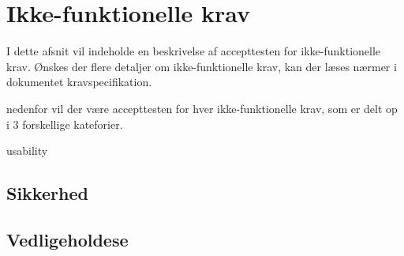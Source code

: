 
\chapter{Ikke-funktionelle krav}

I dette afsnit vil indeholde en beskrivelse af accepttesten for ikke-funktionelle krav. Ønskes der flere detaljer om ikke-funktionelle krav, kan der læses nærmer i dokumentet kravspecifikation.

nedenfor vil der være accepttesten for hver ikke-funktionelle krav, som er delt op i 3 forskellige kateforier.


{usability}

\section{Sikkerhed}

\section{Vedligeholdese}